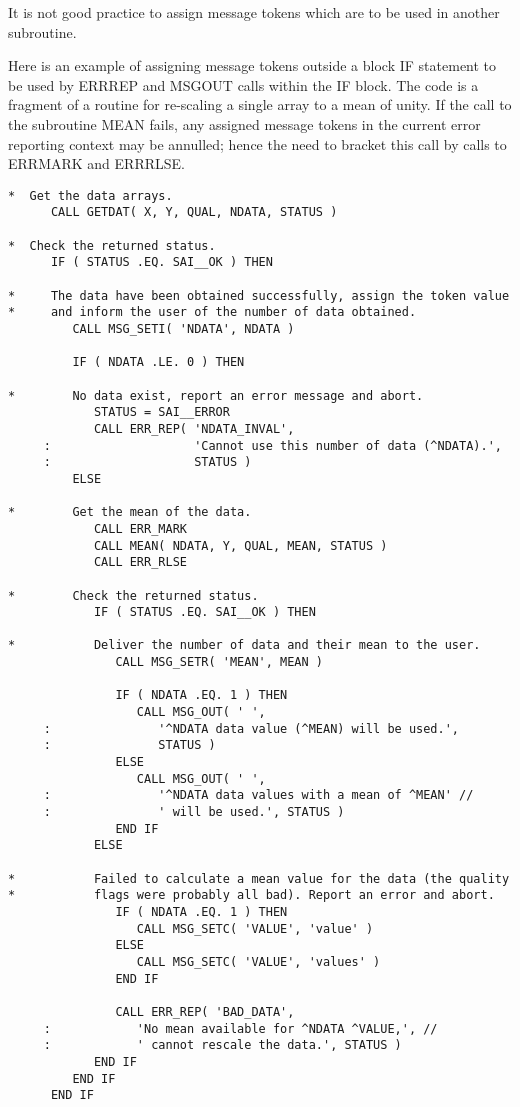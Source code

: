 \documentclass[twoside,11pt]{article}
\renewcommand{\_}{\texttt{\symbol{95}}}
\begin{document}
It is not good practice to assign message tokens which are to be used in
another subroutine.

Here is an example of assigning message tokens outside a block IF statement
to be used by ERR\_REP and MSG\_OUT calls within the IF block.
The code is a fragment of a routine for re-scaling a single array to a mean
of unity.
If the call to the subroutine MEAN fails, any assigned message tokens in the
current error reporting context may be annulled; hence the need to bracket this
call by calls to ERR\_MARK and ERR\_RLSE.

\begin{small}
\begin{verbatim}
*  Get the data arrays.
      CALL GETDAT( X, Y, QUAL, NDATA, STATUS )

*  Check the returned status.
      IF ( STATUS .EQ. SAI__OK ) THEN

*     The data have been obtained successfully, assign the token value
*     and inform the user of the number of data obtained.
         CALL MSG_SETI( 'NDATA', NDATA )

         IF ( NDATA .LE. 0 ) THEN

*        No data exist, report an error message and abort.
            STATUS = SAI__ERROR
            CALL ERR_REP( 'NDATA_INVAL',
     :                    'Cannot use this number of data (^NDATA).',
     :                    STATUS )
         ELSE

*        Get the mean of the data.
            CALL ERR_MARK
            CALL MEAN( NDATA, Y, QUAL, MEAN, STATUS )
            CALL ERR_RLSE

*        Check the returned status.
            IF ( STATUS .EQ. SAI__OK ) THEN

*           Deliver the number of data and their mean to the user.
               CALL MSG_SETR( 'MEAN', MEAN )

               IF ( NDATA .EQ. 1 ) THEN
                  CALL MSG_OUT( ' ',
     :               '^NDATA data value (^MEAN) will be used.',
     :               STATUS )
               ELSE
                  CALL MSG_OUT( ' ',
     :               '^NDATA data values with a mean of ^MEAN' //
     :               ' will be used.', STATUS )
               END IF
            ELSE

*           Failed to calculate a mean value for the data (the quality
*           flags were probably all bad). Report an error and abort.
               IF ( NDATA .EQ. 1 ) THEN
                  CALL MSG_SETC( 'VALUE', 'value' )
               ELSE
                  CALL MSG_SETC( 'VALUE', 'values' )
               END IF

               CALL ERR_REP( 'BAD_DATA',
     :            'No mean available for ^NDATA ^VALUE,', //
     :            ' cannot rescale the data.', STATUS )
            END IF
         END IF
      END IF
\end{verbatim}
\end{small}
\end{document}
